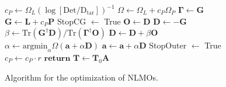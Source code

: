 \documentclass[aps,prl,reprint,amsmath,amssymb]{revtex4-1}
\begin{document}
\begin{figure}
\begin{algorithm}[H]
\begin{algorithmic}[1]
				\State $c_{P} \gets \Omega_{L}(\log [\text{Det} / \text{D}_{\text{tar}} ])^{-1}$ 
			\EndIf
			\State $\Omega \gets \Omega_{L} + c_P \Omega_{P} $ 
				\State $\mathbf{\Gamma} \gets \mathbf{G}$ 
			\EndIf 
			\State $\mathbf{G} \gets \mathbf{L} + c_P \mathbf{P} $ 
				\State StopCG $\gets$ True
			\EndIf
					\State $\mathbf{O} \gets \mathbf{D}$ 
				\EndIf
				\State $\mathbf{D} \gets - \mathbf{G}$ 
					\State $\beta \gets \text{Tr}(\mathbf{G}^{\dagger} \mathbf{D})/\text{Tr}(\mathbf{\Gamma}^{\dagger}\mathbf{O})$
					\State $\mathbf{D} \gets \mathbf{D} + \beta \mathbf{O}$ 
				\EndIf 
				\State $\alpha \gets \text{argmin}_{\alpha} \Omega(\mathbf{a} + \alpha \mathbf{D})$ 
				\State $\mathbf{a}\gets \mathbf{a} + \alpha \mathbf{D}$ 
			\EndIf
			\State StopOuter $\gets$ True
		\EndIf
			\State $c_{P} \gets c_P \cdot r$ 
		\EndIf
	\State $\mathbf{return}$ $\mathbf{T} \gets \mathbf{T}_0 \mathbf{A} $ 
   \end{algorithmic}
\end{algorithm}
\caption{\label{fig:cg} Algorithm for the optimization of NLMOs.}
\end{figure}
\end{document}
